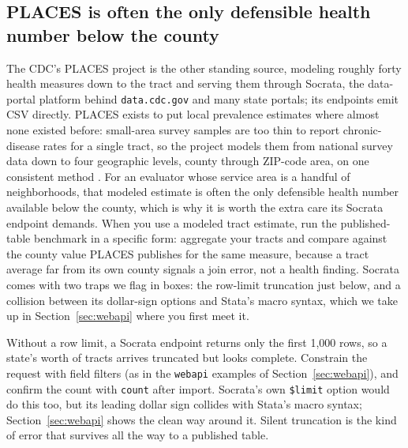 \documentclass[
    a4paper,
    fontsize=10pt,
    twoside=true,
    numbers=noenddot,
]{kaobook}
\newenvironment{vizcallout}[1][Visualization to build]{%
    \begin{vizbox}[frametitle={#1}]%
}{%
    \end{vizbox}%
}
\begin{document}
\subsection{PLACES is often the only defensible health number below the county}\label{ch03-places}
The CDC's PLACES project is the other standing source, modeling roughly forty health measures down to the tract and serving them through Socrata, the data-portal platform behind \texttt{data.cdc.gov} and many state portals; its endpoints emit CSV directly. PLACES exists to put local prevalence estimates where almost none existed before: small-area survey samples are too thin to report chronic-disease rates for a single tract, so the project models them from national survey data down to four geographic levels, county through ZIP-code area, on one consistent method \parencite{greenlund2022places}. For an evaluator whose service area is a handful of neighborhoods, that modeled estimate is often the only defensible health number available below the county, which is why it is worth the extra care its Socrata endpoint demands. When you use a modeled tract estimate, run the published-table benchmark in a specific form: aggregate your tracts and compare against the county value PLACES publishes for the same measure, because a tract average far from its own county signals a join error, not a health finding. Socrata comes with two traps we flag in boxes: the row-limit truncation just below, and a collision between its dollar-sign options and Stata's macro syntax, which we take up in Section~\ref{sec:webapi} where you first meet it.

\begin{vizcallout}[The Socrata truncation trap]
Without a row limit, a Socrata endpoint returns only the first 1{,}000 rows, so a state's worth of tracts arrives truncated but looks complete. Constrain the request with field filters (as in the \texttt{webapi} examples of Section~\ref{sec:webapi}), and confirm the count with \texttt{count} after import. Socrata's own \texttt{\$limit} option would do this too, but its leading dollar sign collides with Stata's macro syntax; Section~\ref{sec:webapi} shows the clean way around it. Silent truncation is the kind of error that survives all the way to a published table.
\end{vizcallout}
\end{document}
